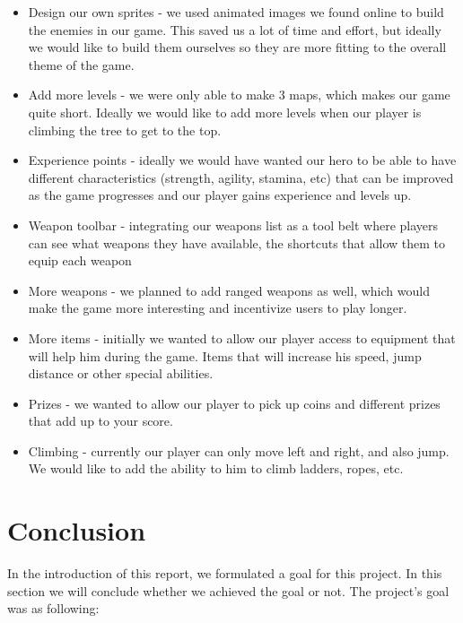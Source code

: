 \documentclass[12p]{article}
\begin{document}
\begin{itemize}
  \item Design our own sprites - we used animated images we found online to build the enemies in our game. This saved us a lot of time and effort, but ideally we would like to build them ourselves so they are more fitting to the overall theme of the game.
  \item Add more levels - we were only able to make 3 maps, which makes our game quite short. Ideally we would like to add more levels when our player is climbing the tree to get to the top.
  \item Experience points - ideally we would have wanted our hero to be able to have different characteristics (strength, agility, stamina, etc) that can be improved as the game progresses and our player gains experience and levels up.
  \item Weapon toolbar - integrating our weapons list as a tool belt where players can see what weapons they have available, the shortcuts that allow them to equip each weapon 
  \item More weapons - we planned to add ranged weapons as well, which would make the game more interesting and incentivize users to play longer.
  \item More items - initially we wanted to allow our player access to equipment that will help him during the game. Items that will increase his speed, jump distance or other special abilities.
  \item Prizes - we wanted to allow our player to pick up coins and different prizes that add up to your score.
  \item Climbing - currently our player can only move left and right, and also jump. We would like to add the ability to him to climb ladders, ropes, etc.
\end{itemize}


\newpage
\section{Conclusion}

In the introduction of this report, we formulated a goal for this project. In this section we will conclude whether we achieved the goal or not. The project's goal was as following:
\end{document}
